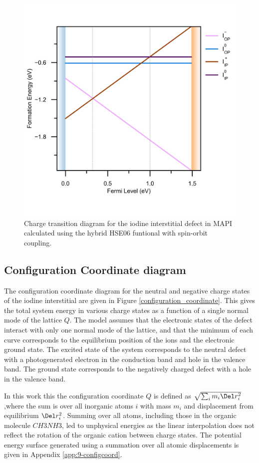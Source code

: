 \begin{figure}[h!]   
\centering
  \includegraphics[width=0.7\columnwidth]{figures/ch6/charge_transition_HSE.png}
  \caption[Charge transition diagram for the iodine interstitial defect in MAPI]{Charge transition diagram for the iodine interstitial defect in MAPI calculated using the hybrid HSE06 funtional with spin-orbit coupling.}
\label{charge_transition_diagram}
\end{figure}



\subsection{Configuration Coordinate diagram} \label{ch6:ccd}

The configuration coordinate diagram for the neutral and negative charge states of the iodine interstitial are given in Figure \ref{configuration_coordinate}.
This gives the total system energy in various charge states as a function of a single normal mode of the lattice $Q$. 
The model assumes that the electronic states of the defect interact with only one normal mode of the lattice, and that
the minimum of each curve corresponds to the equilibrium position of the ions and the electronic ground state. 
The excited state of the system corresponds to the neutral defect with a photogenerated electron in the conduction band and hole in the valence band. The ground state corresponds to the negatively charged defect with a hole in the valence band.
\autocite{alkauskas defect theory and experiment}

In this work this the configuration coordinate $Q$ is defined as $\sqrt{\sum_i m_i \Del r_i^2}$ ,where the sum is over all inorganic atoms $i$ with mass $m_i$ and displacement from equilibrium $\Del r_i^2$. Summing over all atoms, including those in the organic molecule $CH3NH3$, led to unphysical energies as the linear interpolation does not reflect the rotation of the organic cation between charge states. The potential energy surface generated using a summation over all atomic displacements is given in Appendix \ref{app:9-configcoord}.

